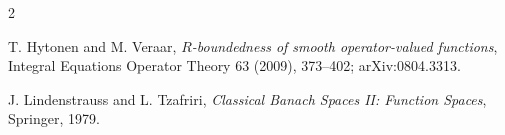\documentclass[11pt]{amsart}
\begin{document}
\begin{thebibliography}{2}

T. Hytonen and M. Veraar,
\emph{$R$-boundedness of smooth operator-valued functions},
Integral Equations Operator Theory 63 (2009), 373--402;
arXiv:0804.3313.

J. Lindenstrauss and L. Tzafriri,
\emph{Classical Banach Spaces II: Function Spaces},
Springer, 1979.

\end{thebibliography}
\end{document}
